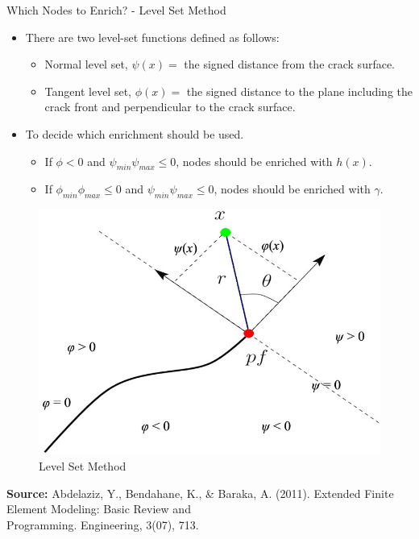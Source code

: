 \documentclass{beamer}
\begin{document}
\begin{frame}[t,fragile]{Which Nodes to Enrich? - Level Set Method}
    \vspace{-.3cm}
    \footnotesize
    \begin{itemize}
        \item There are two level-set functions defined as follows:
          \begin{itemize}
        \item Normal level set, $\psi(x)=$ the signed distance from the crack surface.
        \item Tangent level set, $\phi(x)=$ the signed distance to the plane including the crack front and perpendicular to the crack surface.
        \end{itemize}
    \item To decide which enrichment should be used. 
        \begin{itemize}
            \item If $\phi < 0 $ and $\psi_{min}\psi_{max}\leq 0$, nodes should be enriched with $h(x)$.
            \item If $\phi_{min}\phi_{max}\leq 0$ and $\psi_{min}\psi_{max}\leq 0 $, nodes should be enriched with $\gamma$.
        \end{itemize}
    \end{itemize}
  \begin{figure}
                \centering
                \vspace{-15pt}
                \includegraphics[scale=.15]{levelset.jpg}
                \caption{\tiny Level Set Method}
                \label{4}
            \end{figure}
    \tiny 
    \vspace{-20pt}
  \hspace{10pt}
    \textbf{Source:} Abdelaziz, Y., Bendahane, K., \& Baraka, A. (2011). Extended Finite Element Modeling: Basic Review and\\
  \vspace{-1pt}
  \hspace{10pt}
    Programming. Engineering, 3(07), 713.

\end{frame}
\end{document}
